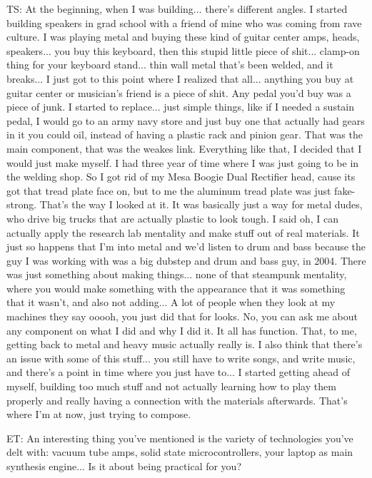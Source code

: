 TS: At the beginning, when I was building... there's different angles. I started building speakers in grad school with a friend of mine who was coming from rave culture. I was playing metal and buying these kind of guitar center amps, heads, speakers... you buy this keyboard, then this stupid little piece of shit... clamp-on thing for your keyboard stand... thin wall metal that's been welded, and it breaks... I just got to this point where I realized that all... anything you buy at guitar center or musician's friend is a piece of shit. Any pedal you'd buy was a piece of junk. I started to replace... just simple things, like if I needed a sustain pedal, I would go to an army navy store and just buy one that actually had gears in it you could oil, instead of having a plastic rack and pinion gear. That was the main component, that was the weakes link. Everything like that, I decided that I would just make myself. I had three year of time where I was just going to be in the welding shop. So I got rid of my Mesa Boogie Dual Rectifier head, cause its got that tread plate face on, but to me the aluminum tread plate was just fake-strong. That's the way I looked at it. It was basically just a way for metal dudes, who drive big trucks that are actually plastic to look tough. I said oh, I can actually apply the research lab mentality and make stuff out of real materials. It just so happens that I'm into metal and we'd listen to drum and bass because the guy I was working with was a big dubstep and drum and bass guy, in 2004. There was just something about making things... none of that steampunk mentality, where you would make something with the appearance that it was something that it wasn't, and also not adding... A lot of people when they look at my machines they say ooooh, you just did that for looks. No, you can ask me about any component on what I did and why I did it. It all has function. That, to me, getting back to metal and heavy music actually really is. I also think that there's an issue with some of this stuff... you still have to write songs, and write music, and there's a point in time where you just have to... I started getting ahead of myself, building too much stuff and not actually learning how to play them properly and really having a connection with the materials afterwards. That's where I'm at now, just trying to compose. 

ET: An interesting thing you've mentioned is the variety of technologies you've delt with: vacuum tube amps, solid state microcontrollers, your laptop as main synthesis engine... Is it about being practical for you? 

